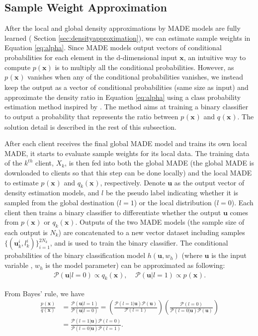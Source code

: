 \documentclass[mathfont=newtx]{uai2023} %
\newcommand{\px}[2]{p_{#1}(\mathbf{x_{#2}})}
\newcommand{\qx}[2]{q_{#1}(\mathbf{x_{#2}})}
\newcommand{\Prob}{\mathcal{P} }
\newcommand{\ubold}{\mathbf{u}}
\begin{document}
\subsection{Sample Weight Approximation}
\label{sec:weightapproximation}
After the local and global density approximations by MADE models are fully learned ( Section \ref{sec:densityapproximation}), we can estimate sample weights in Equation \ref{eq:alpha}. Since MADE models output vectors of conditional probabilities for each element in the d-dimensional input $\mathbf{x}$, an intuitive way to compute $p(\mathbf{x})$ is to multiply all the conditional probabilities. However, as $\px{}{}$ vanishes when any of the conditional probabilities vanishes, we instead keep the output as a vector of conditional probabilities (same size as input) and approximate the density ratio in Equation \ref{eq:alpha} using a class probability estimation method inspired by \cite{densityratio}. The method aims at training a binary classifier to output a probability that represents the ratio between $\px{}{}$ and $\qx{}{}$. The solution detail is described in the rest of this subsection. 

After each client receives the final global MADE model and trains its own local MADE, it starts to evaluate sample weights for its local data. The training data of the $k^{th}$ client, $X_k$, is then fed into both the global MADE (the global MADE is downloaded to clients so that this step can be done locally) and the local MADE to estimate $\px{}{}$ and $\qx{k}{}$, respectively. Denote $\ubold{}$ as the output vector of density estimation models, and $l$ be the pseudo label indicating whether it is sampled from the global destination ($l=1$) or the local distribution ($l=0$). Each client then trains a binary classifier to differentiate whether the output $\ubold$ comes from $\px{}{}$ or $\qx{k}{}$. Outputs of the two MADE models (the sample size of each output is $N_k$) are concatenated to a new vector dataset including samples $\{(\ubold{}_k^i,l_k^i) \}_{i=1}^{2N_k}$, and is used to train the binary classifier. The conditional probabilities of the binary classification model $h(\ubold,w_h)$ (where $\ubold$ is the input variable , $w_h$ is the model parameter) can be approximated as following: 
\begin{align}
	\Prob(\ubold | l=0 )  \propto  \qx{k}{}  ,\;\;\;\;
    \Prob(\ubold | l=1 )  \propto \px{}{}.
\end{align}

From Bayes' rule, we have
\begin{align}
	\frac{\px{}{}}{\qx{}{}} &= \frac{\Prob(\ubold | l=1 )}{ \Prob(\ubold | l=0 ) }       
	= \left( \frac{\Prob(l=1| \ubold ) \Prob(\ubold)}{\Prob(l=1)} \right)     
	\left( \frac{\Prob(l=0)} {\Prob(l=0| \ubold ) \Prob(\ubold)}\right)  \label{eq:pq1}\\
	 &= \frac{  \Prob(l=1|\ubold )  \Prob(l=0) }{ \Prob(l=0|\ubold )  \Prob(l=1)  }.  \label{eq:pq2} 
\end{align}
\end{document}
